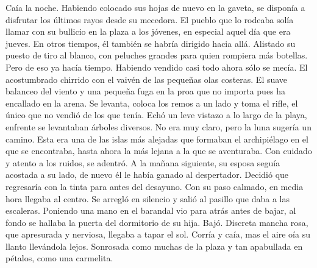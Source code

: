 {}Caía la noche. Habiendo colocado sus hojas de nuevo en la gaveta, se disponía a disfrutar los últimos rayos desde su mecedora. El pueblo que lo rodeaba solía llamar con su bullicio en la plaza a los jóvenes, en especial aquel día que era jueves. En otros tiempos, él también se habría dirigido hacia allá. Alistado su puesto de tiro al blanco, con peluches grandes para quien rompiera más botellas. Pero de eso ya hacía tiempo. Habiendo vendido casi todo ahora sólo se mecía. El acostumbrado chirrido con el vaivén de las pequeñas olas costeras. El suave balanceo del viento y una pequeña fuga en la proa que no importa pues ha encallado en la arena. Se levanta, coloca los remos a un lado y toma el rifle, el único que no vendió de los que tenía. Echó un leve vistazo a lo largo de la playa, enfrente se levantaban árboles diversos. No era muy claro, pero la luna sugería un camino. Esta era una de las islas más alejadas que formaban el archipiélago en el que se encontraba, hasta ahora la más lejana a la que se aventuraba. Con cuidado y atento a los ruidos, se adentró.\markdownRendererInterblockSeparator
{}A la mañana siguiente, su esposa seguía acostada a su lado, de nuevo él le había ganado al despertador. Decidió que regresaría con la tinta para antes del desayuno. Con su paso calmado, en media hora llegaba al centro. Se arregló en silencio y salió al pasillo que daba a las escaleras. Poniendo una mano en el barandal vio para atrás antes de bajar, al fondo se hallaba la puerta del dormitorio de su hija. Bajó.\markdownRendererInterblockSeparator
{}Discreta mancha rosa, que apresurada y nerviosa, llegaba a tapar el sol. Corría y caía, mas el aire oía su llanto llevándola lejos.\markdownRendererInterblockSeparator
{}Sonrosada como muchas de la plaza y tan apabullada en pétalos, como una carmelita.\relax